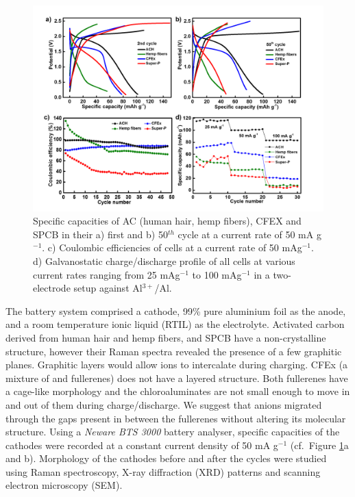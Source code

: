 \documentclass{article}
\begin{document}
\begin{figure}[h!]
  \centering
  \includegraphics[width=\textwidth]{fig/CDCall}
    \caption{Specific capacities of AC (human hair, hemp fibers), CFEX and SPCB in their a) first and b) 50$^{th}$ cycle at a current rate of 50 mA g$^{-1}$. c) Coulombic efficiencies of cells at a current rate of 50 mAg$^{-1}$. d) Galvanostatic charge/discharge profile of all cells at various current rates ranging from 25 mAg$^{-1}$ to 100 mAg$^{-1}$ in a two-electrode setup against Al$^{3+}$/Al.}
  \label{fig:CDCall}
\end{figure}

The battery system comprised a cathode, 99\% pure aluminium foil as the anode, and a room temperature ionic liquid (RTIL) as the electrolyte. Activated carbon derived from human hair and hemp fibers, and SPCB have a non-crystalline structure, however their Raman spectra revealed the presence of a few graphitic planes. Graphitic layers would allow  ions to intercalate during charging. CFEx (a mixture of  and  fullerenes) does not have a layered structure. Both fullerenes have a cage-like morphology and the chloroaluminates are not small enough to move in and out of them during charge/discharge. We suggest that  anions migrated through the gaps present in between the fullerenes without altering its molecular structure. Using a \textit{Neware BTS 3000} battery analyser, specific capacities of the cathodes were recorded at a constant current density of 50 mA g$^{-1}$ (cf.\ Figure \ref{fig:CDCall}a and b). Morphology of the cathodes before and after the cycles were studied using Raman spectroscopy, X-ray diffraction (XRD) patterns and scanning electron microscopy (SEM).
\end{document}
